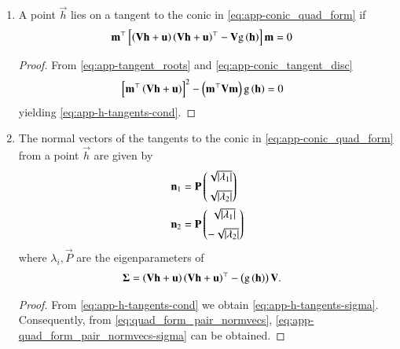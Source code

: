\begin{enumerate}[label=\thesubsection.\arabic*.,ref=\thesubsection.\theenumi]
\begin{proof}
\begin{multline}
\brak{- \frac{\vec{m}^\top(\vec{Vh}+\vec{u})}{\vec{m}^\top\vec{V}\vec{n}}}^2\vec{n}^{\top}\vec{V}\vec{n} 
	+ 2 \brak{- \frac{\vec{m}^\top(\vec{Vh}+\vec{u})}{\vec{m}^\top\vec{V}\vec{n}}}\vec{n}^{\top}\brak{\vec{V}\vec{h}+\vec{u}} 
+  \text{g}\brak{
  \vec{h}
	  }
	= 0
\end{multline}
	yielding
	\eqref{eq:app-point_of_tangency-m}.
\end{proof}
\item  A point $\vec{h}$ lies on a tangent to the conic in \eqref{eq:app-conic_quad_form} if 
\begin{align}
	  \label{eq:app-h-tangents-cond}
  \mathbf{m}^{\top}  {}\left[\left(\mathbf{V}\mathbf{h}+\mathbf{u}\right)
	  \left(\mathbf{V}\mathbf{h}+\mathbf{u}\right)^{\top}
   -\mathbf{V}
	  \text{g}\left(
  \mathbf{h}
	  \right)
	  \right]\mathbf{m} 
	  &= 0                                                                                             
\end{align}
\begin{proof}
 From \eqref{eq:app-tangent_roots}
 and
  \eqref{eq:app-conic_tangent_disc}
  \begin{align}
  {}\left[
  \mathbf{m}^{\top}\left(\mathbf{V}\mathbf{h}+\mathbf{u}\right)
  \right]^2 -\left(\mathbf{m}^{\top}\mathbf{V}\mathbf{m}\right)
	  \text{g}\left(
  \mathbf{h}
	  \right)
	  &= 0                                                                                             
  \label{eq:app-conic_tangent_disc-h}
  \end{align}                    
  yielding
	  \eqref{eq:app-h-tangents-cond}.
\end{proof}
\item
	The normal vectors of the tangents 
to the conic in \eqref{eq:app-conic_quad_form} 
	from 
	a point $\vec{h}$ 
	are given by 
  \begin{align} 
  \label{eq:app-quad_form_pair_normvecs-sigma}
  \begin{split}
  \mathbf{n}_1 &= \mathbf{P}\begin{pmatrix}\sqrt{\left\vert\lambda_1\right\vert} \\[2mm]  \sqrt{\left\vert\lambda_2\right\vert}\end{pmatrix}
  \\
  \mathbf{n}_2 &= \mathbf{P}\begin{pmatrix}\sqrt{\left\vert\lambda_1\right\vert} \\[2mm] - \sqrt{\left\vert\lambda_2\right\vert}\end{pmatrix}
  \end{split}
  \end{align} 
  where $\lambda_i, \vec{P}$ are the eigenparameters of 
  \begin{align} 
		\bm{\Sigma} &= 
	   \left(\mathbf{V}\mathbf{h}+\mathbf{u}\right)
	  \left(\mathbf{V}\mathbf{h}+\mathbf{u}\right)^{\top}
   -
  \left(
	  \text{g}\left(
  \mathbf{h}
	  \right)
  \right)\mathbf{V}.
	  \label{eq:app-h-tangents-sigma}
  \end{align}                    
  \begin{proof}
	  From 
	  \eqref{eq:app-h-tangents-cond} we obtain
	  \eqref{eq:app-h-tangents-sigma}.  Consequently, from 
  \eqref{eq:quad_form_pair_normvecs}, 
  \eqref{eq:app-quad_form_pair_normvecs-sigma}
  can be obtained.
  \end{proof}


\end{enumerate}
